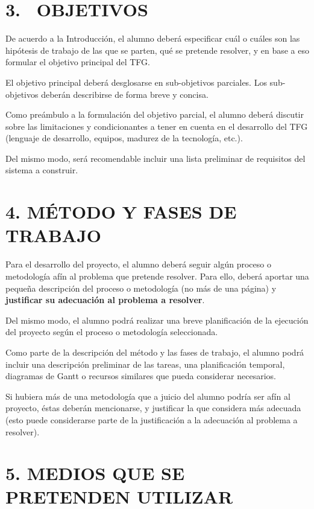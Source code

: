 \documentclass[a4paper]{article}
\begin{document}
\section{3. \ OBJETIVOS}
De acuerdo a la Introducci\'on, el alumno deber\'a especificar cu\'al o cuáles son las hip\'otesis de trabajo de las
que se parten, qu\'e se pretende resolver, y en base a eso formular el objetivo principal del TFG.

El objetivo principal deber\'a desglosarse en sub-objetivos parciales. Los sub-objetivos deberán describirse de forma breve y concisa.

Como pre\'ambulo a la formulaci\'on del objetivo parcial, el alumno deber\'a discutir sobre las limitaciones y
condicionantes a tener en cuenta en el desarrollo del TFG (lenguaje de desarrollo, equipos, madurez de la tecnolog\'ia,
etc.).

Del mismo modo, ser\'a recomendable incluir una lista preliminar de requisitos del sistema a construir.

\section[4. M\'ETODO Y FASES DE TRABAJO]{4. M\'ETODO Y FASES DE TRABAJO}

\bigskip

Para el desarrollo del proyecto, el alumno deber\'a seguir alg\'un proceso o metodolog\'ia af\'in al problema que
pretende resolver. Para ello, deber\'a aportar una peque\~na descripci\'on del proceso o metodolog\'ia (no m\'as de una
p\'agina) y \textbf{justificar su adecuaci\'on al problema a resolver}.

Del mismo modo, el alumno podrá realizar una breve planificaci\'on de la ejecuci\'on del proyecto seg\'un el proceso
o metodolog\'ia seleccionada.

Como parte de la descripci\'on del m\'etodo y las fases de trabajo, el alumno podr\'a incluir una descripci\'on
preliminar de las tareas, una planificaci\'on temporal, diagramas de Gantt o recursos similares que pueda considerar
necesarios.

Si hubiera m\'as de una metodolog\'ia que a juicio del alumno podr\'ia ser af\'in al proyecto, \'estas deber\'an
mencionarse, y justificar la que considera m\'as adecuada (esto puede considerarse parte de la justificaci\'on a la
adecuaci\'on al problema a resolver).

\section{5. MEDIOS QUE SE PRETENDEN UTILIZAR}
\end{document}
